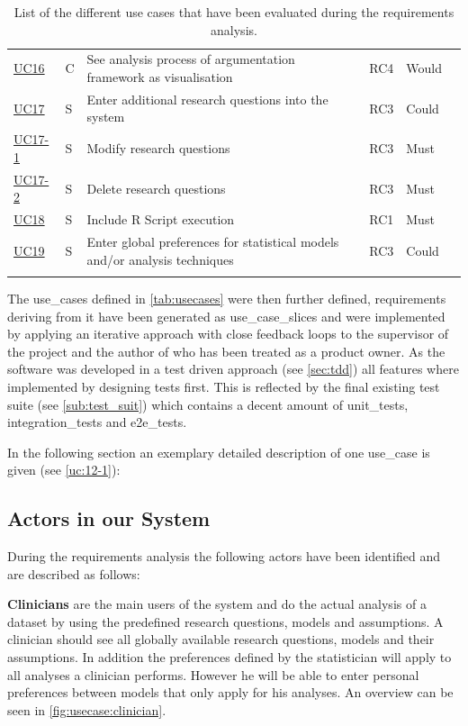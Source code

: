 \begin{landscape}
\begin{longtable}{ l l p{10.5cm} l l p{3cm} }
		\href{https://trello.com/c/3FCcFdmm}{UC16}  &   C & 	See analysis process of argumentation framework as visualisation & RC4 & Would	&    \\
		\href{https://trello.com/c/Hv2xe2UW}{UC17}  &   S & 	Enter additional research questions into the system & RC3 &Could& \\
		\href{https://trello.com/c/w1YiIgU7}{UC17-1}&   S & 	Modify research questions&RC3 & Must &  \\
		\href{https://trello.com/c/UbT5mtDx}{UC17-2}&   S & 	Delete research questions&RC3&Must& \\
		\href{https://trello.com/c/dpLHOxbB}{UC18}  &   S & 	Include R Script execution	 & RC1 & Must & \\
		\href{https://trello.com/c/bZHdWpkt}{UC19}  &   S & 	Enter global preferences for statistical models and/or analysis techniques& RC3 & Could &	 \\

		\caption{List of the different use cases that have been evaluated during the requirements analysis.}	
		\label{tab:usecases}
	\end{longtable}
\end{landscape}

The \glspl{use_case} defined in \autoref{tab:usecases} were then further defined, requirements deriving from it have been generated as \glspl{use_case_slice} and were implemented by applying an iterative approach with close feedback loops to the supervisor of the project and the author of \cite{sassoon2014,sassoon2016, sassoon2016CD} who has been treated as a product owner. As the software was developed in a test driven approach (see \autoref{sec:tdd}) all features where implemented by designing tests first. This is reflected by the final existing test suite (see \autoref{sub:test_suit}) which contains a decent amount of \glspl{unit_test}, \glspl{integration_test} and \glspl{e2e_test}.

In the following section an exemplary detailed description of one \gls{use_case} is given (see \autoref{uc:12-1}):





\subsection{Actors in our System}
\label{sub:sassoon:actors}
During the requirements analysis the following actors have been identified and are described as follows:

\textbf{Clinicians} are the main users of the system and do the actual analysis of a dataset by using the predefined research questions, models and assumptions. A clinician should see all globally available research questions, models and their assumptions. In addition the preferences defined by the statistician will apply to all analyses a clinician performs. However he will be able to enter personal preferences between models that only apply for his analyses. An overview can be seen in \autoref{fig:usecase:clinician}.

